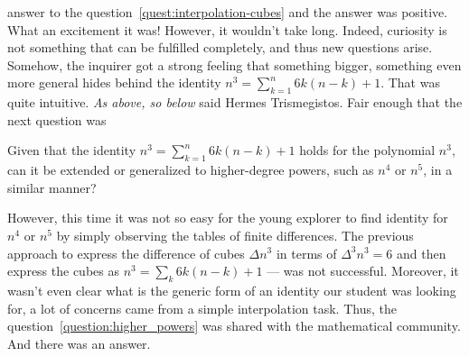 answer to the question~\eqref{quest:interpolation-cubes} and the answer was positive.
What an excitement it was!
However, it wouldn't take long.
Indeed, curiosity is not something that can be fulfilled completely,
and thus new questions arise.
Somehow, the inquirer got a strong feeling that something bigger, something even more general
hides behind the identity $n^3 = \sum_{k=1}^{n} 6k(n-k) + 1$.
That was quite intuitive.
\textit{As above, so below} said Hermes Trismegistos.
Fair enough that the next question was
\begin{question}
    Given that the identity $n^3 = \sum_{k=1}^{n} 6k(n-k) + 1$ holds for the polynomial $n^3$,
    can it be extended or generalized to higher-degree powers, such as $n^4$ or $n^5$,
    in a similar manner?
    \label{question:higher_powers}
\end{question}

However, this time it was not so easy for the young explorer to find identity for $n^4$ or $n^5$
by simply observing the tables of finite differences.
The previous approach to express the difference of cubes $\Delta n^3$ in terms of
$\Delta^3 n^3 = 6$ and then express the cubes as $n^3 = \sum_k 6k (n-k) +1$ --- was not successful.
Moreover, it wasn't even clear what is the generic form of an identity our student was looking for,
a lot of concerns came from a simple interpolation task.
Thus, the question~\eqref{question:higher_powers} was shared with the mathematical community.
And there was an answer.
